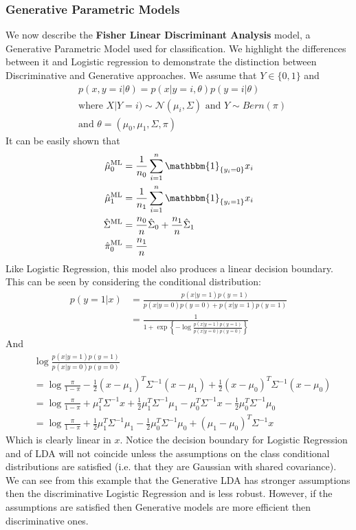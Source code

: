 \documentclass[]{article}
\theoremstyle{mattstyle}
\theoremstyle{definition}
\begin{document}
\subsubsection{Generative Parametric Models}

We now describe the \textbf{Fisher Linear Discriminant Analysis} model, a  Generative Parametric Model used for classification. We highlight the differences between it and Logistic regression to demonstrate the distinction between Discriminative and Generative approaches. We assume that $Y \in \{0,1\}$ and 
\begin{align*}
&p(x,y=i|\theta)=p(x|y=i,\theta)p(y=i|\theta)\\
&\text{where $X|Y=i)\sim \mathcal{N}(\mu_i,\Sigma)$ and $Y\sim Bern(\pi)$}\\
&\text{and $\theta=(\mu_0,\mu_1,\Sigma,\pi)$}
\end{align*}
It can be easily shown that
\begin{align*}
\hat{\mu}_0^{\text{ML}} &= \frac{1}{n_0}\sum_{i=1}^n \mathbbm{1}_{\{y_i = 0\}}x_i\\
\hat{\mu}_1^{\text{ML}} &= \frac{1}{n_1}\sum_{i=1}^n \mathbbm{1}_{\{y_i = 1\}}x_i\\
\hat{\Sigma}^{\text{ML}} &= \frac{n_0}{n}\hat{\Sigma}_0 + \frac{n_1}{n}\hat{\Sigma}_1\\
\hat{\pi}_0^{\text{ML}}&=\frac{n_1}{n}
\end{align*}
Like Logistic Regression, this model also produces a linear decision boundary. This can be seen by considering the conditional distribution:
\begin{align*}
p(y = 1|x) &= \frac{p(x | y = 1)p(y=1)}{p(x | y = 0)p(y=0) + p(x | y = 1)p(y=1)}\\
&= \frac{1}{1 + \exp\left\{-\log\frac{p(x | y = 1)p(y=1)}{p(x | y = 0)p(y=0)}\right\}}
\end{align*}
And 
\begin{align*}
&\log\frac{p(x | y = 1)p(y=1)}{p(x | y = 0)p(y=0)}\\
&= \log \frac{\pi}{1-\pi} - \frac{1}{2}(x-\mu_1)^T\Sigma^{-1}(x-\mu_1) + \frac{1}{2}(x-\mu_0)^T\Sigma^{-1}(x-\mu_0)\\ 
&= \log \frac{\pi}{1-\pi} + \mu_1^T\Sigma^{-1}x +\frac{1}{2}\mu_1^T\Sigma^{-1}\mu_1 - \mu_0^T\Sigma^{-1}x -\frac{1}{2}\mu_0^T\Sigma^{-1}\mu_0\\
&= \log \frac{\pi}{1-\pi} +\frac{1}{2}\mu_1^T\Sigma^{-1}\mu_1 -\frac{1}{2}\mu_0^T\Sigma^{-1}\mu_0 + (\mu_1-\mu_0)^T\Sigma^{-1}x
\end{align*}
Which is clearly linear in $x$. Notice the decision boundary for Logistic Regression and of LDA will not coincide unless the assumptions on the class conditional distributions are satisfied (i.e. that they are Gaussian with shared covariance). We can see from this example that the Generative LDA has stronger assumptions then the discriminative Logistic Regression and is less robust. However, if the assumptions are satisfied then Generative models are more efficient then discriminative ones.
\end{document}
